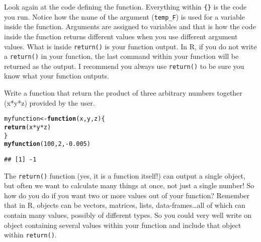 \documentclass[12pt,a4paper]{scrartcl}\usepackage[]{graphicx}\usepackage[]{color}
\makeatletter
\newcommand{\hlnum}[1]{\textcolor[rgb]{0.686,0.059,0.569}{#1}}%
\newcommand{\hlopt}[1]{\textcolor[rgb]{0,0,0}{#1}}%
\newcommand{\hlstd}[1]{\textcolor[rgb]{0.345,0.345,0.345}{#1}}%
\newcommand{\hlkwa}[1]{\textcolor[rgb]{0.161,0.373,0.58}{\textbf{#1}}}%
\newcommand{\hlkwb}[1]{\textcolor[rgb]{0.69,0.353,0.396}{#1}}%
\newcommand{\hlkwc}[1]{\textcolor[rgb]{0.333,0.667,0.333}{#1}}%
\newcommand{\hlkwd}[1]{\textcolor[rgb]{0.737,0.353,0.396}{\textbf{#1}}}%
\newenvironment{kframe}{%
 \def\at@end@of@kframe{}%
 \ifinner\ifhmode%
  \def\at@end@of@kframe{\end{minipage}}%
  \begin{minipage}{\columnwidth}%
 \fi\fi%
 \def\FrameCommand##1{\hskip\@totalleftmargin \hskip-\fboxsep
 \colorbox{shadecolor}{##1}\hskip-\fboxsep
     \hskip-\linewidth \hskip-\@totalleftmargin \hskip\columnwidth}%
 \MakeFramed {\advance\hsize-\width
   \@totalleftmargin\z@ \linewidth\hsize
   \@setminipage}}%
 {\par\unskip\endMakeFramed%
 \at@end@of@kframe}
\newenvironment{knitrout}{}{} %
\makeatother
\begin{document}
Look again at the code defining the function. Everything within \texttt{\{\}} is the code you run. Notice how the name of the argument (\texttt{temp\_F}) is used for a variable inside the function. Arguments are assigned to variables and that is how the code inside the function returns different values when you use different argument values.
What is inside \texttt{return()} is your function output. In R, if you do not write a \texttt{return()} in your function, the last command within your function will be returned as the output. I recommend you always use \texttt{return()} to be sure you know what your function outputs. 

\begin{Exercise}[difficulty=1, title={Build a first function}]
Write a function that return the product of three arbitrary numbers together (x*y*z) provided by the user.
\end{Exercise}
\begin{Answer}
\begin{knitrout}
\color{fgcolor}\begin{kframe}
\begin{alltt}
\hlstd{myfunction} \hlkwb{<-} \hlkwa{function}\hlstd{(}\hlkwc{x}\hlstd{,}\hlkwc{y}\hlstd{,}\hlkwc{z}\hlstd{)\{}
  \hlkwd{return}\hlstd{(x}\hlopt{*}\hlstd{y}\hlopt{*}\hlstd{z)}
\hlstd{\}}
\hlkwd{myfunction}\hlstd{(}\hlnum{100}\hlstd{,}\hlnum{2}\hlstd{,} \hlopt{-}\hlnum{0.005}\hlstd{)}
\end{alltt}
\begin{verbatim}
## [1] -1
\end{verbatim}
\end{kframe}
\end{knitrout}
\end{Answer}

The \texttt{return()} function (yes, it is a function itself!) can output a single object, but often we want to calculate many things at once, not just a single number! So how do you do if you want two or more values out of your function? 
Remember that in R, objects can be vectors, matrices, lists, data-frames\dots all of which can contain many values, possibly of different types. So you could very well write on object containing several values within your function and include that object within \texttt{return()}.
\end{document}
